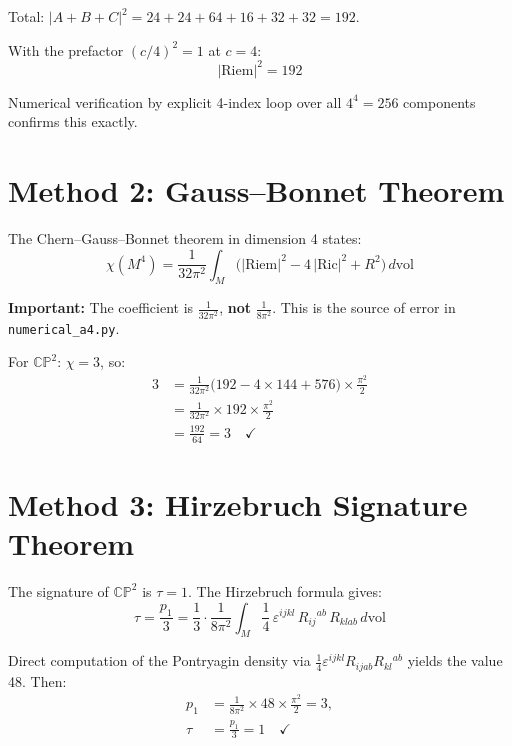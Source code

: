\documentclass[11pt]{article}
\newcommand{\Riem}{\mathrm{Riem}}
\newcommand{\Ric}{\mathrm{Ric}}
\begin{document}
Total: $|A+B+C|^2 = 24 + 24 + 64 + 16 + 32 + 32 = 192$.

With the prefactor $(c/4)^2 = 1$ at $c=4$:
\begin{equation}
  \boxed{|\Riem|^2 = 192}
\end{equation}

Numerical verification by explicit 4-index loop over all $4^4 = 256$ components confirms
this exactly.

\section{Method 2: Gauss--Bonnet Theorem}

The Chern--Gauss--Bonnet theorem in dimension 4 states:
\begin{equation}\label{eq:GB}
  \chi(M^4) = \frac{1}{32\pi^2}\int_{M}
  \bigl(|\Riem|^2 - 4\,|\Ric|^2 + R^2\bigr)\,d\mathrm{vol}
\end{equation}

\textbf{Important:} The coefficient is $\frac{1}{32\pi^2}$, \textbf{not} $\frac{1}{8\pi^2}$.
This is the source of error in \texttt{numerical\_a4.py}.

For $\mathbb{CP}^2$: $\chi = 3$, so:
\begin{align}
  3 &= \frac{1}{32\pi^2}\bigl(192 - 4\times 144 + 576\bigr)\times\frac{\pi^2}{2} \\
    &= \frac{1}{32\pi^2}\times 192 \times \frac{\pi^2}{2} \\
    &= \frac{192}{64} = 3 \quad\checkmark
\end{align}

\section{Method 3: Hirzebruch Signature Theorem}

The signature of $\mathbb{CP}^2$ is $\tau = 1$. The Hirzebruch formula gives:
\begin{equation}
  \tau = \frac{p_1}{3} = \frac{1}{3}\cdot\frac{1}{8\pi^2}
  \int_M \frac{1}{4}\,\varepsilon^{ijkl}\,R_{ij}{}^{ab}\,R_{klab}\,d\mathrm{vol}
\end{equation}

Direct computation of the Pontryagin density via $\frac{1}{4}\varepsilon^{ijkl}R_{ijab}R_{kl}{}^{ab}$
yields the value 48. Then:
\begin{align}
  p_1 &= \frac{1}{8\pi^2}\times 48 \times \frac{\pi^2}{2} = 3, \\
  \tau &= \frac{p_1}{3} = 1 \quad\checkmark
\end{align}
\end{document}
